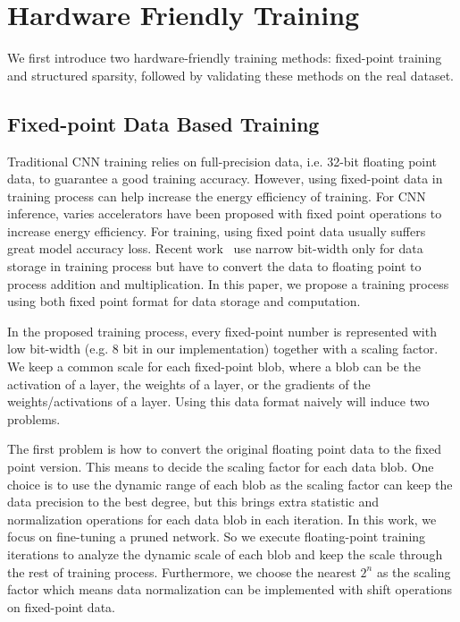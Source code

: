\section{Hardware Friendly Training}\label{sec:training}

We first introduce two hardware-friendly training methods: fixed-point training and structured sparsity, followed by validating these methods on the real dataset.

\subsection{Fixed-point Data Based Training}
Traditional CNN training relies on full-precision data, i.e. 32-bit floating point data, to guarantee a good training accuracy. However, using fixed-point data in training process can help increase the energy efficiency of training. For CNN inference, varies accelerators have been proposed with fixed point operations to increase energy efficiency. For training, using fixed point data usually suffers great model accuracy loss. Recent work~\cite{zhou2016dorefa} use narrow bit-width only for data storage in training process but have to convert the data to floating point to process addition and multiplication. In this paper, we propose a training process using both fixed point format for data storage and computation. 

In the proposed training process, every fixed-point number is represented with low bit-width (e.g. 8 bit in our implementation) together with a scaling factor. We keep a common scale for each fixed-point blob, where a blob can be the activation of a layer, the weights of a layer, or the gradients of the weights/activations of a layer. Using this data format naively will induce two problems.

The first problem is how to convert the original floating point data to the fixed point version. This means to decide the scaling factor for each data blob. One choice is to use the dynamic range of each blob as the scaling factor can keep the data precision to the best degree, but this brings extra statistic and normalization operations for each data blob in each iteration. In this work, we focus on fine-tuning a pruned network. 
So we execute floating-point training iterations to analyze the dynamic scale of each blob and keep the scale through the rest of training process. Furthermore, we choose the nearest $2^n$ as the scaling factor which means data normalization can be implemented with shift operations on fixed-point data.

